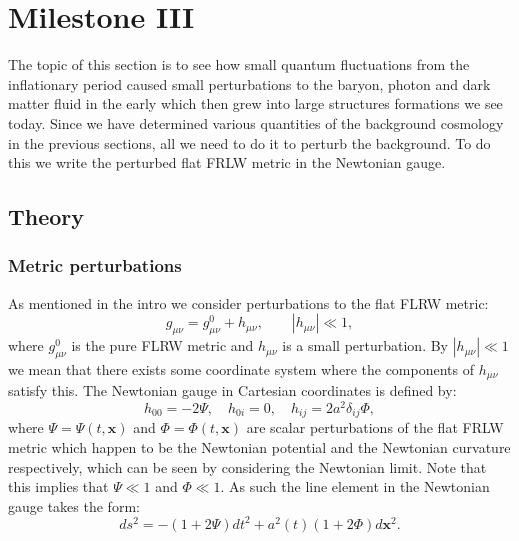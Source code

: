 \documentclass[%
reprint,
 amsmath,amssymb,
 aps,
]{revtex4-2}
\begin{document}
\section{Milestone III}
The topic of this section is to see how small quantum fluctuations from the inflationary period caused small perturbations to the baryon, photon and dark matter fluid in the early which then grew into large structures formations we see today. Since we have determined various quantities of the background cosmology in the previous sections, all we need to do it to perturb the background. To do this we write the perturbed flat FRLW metric in the Newtonian gauge. 

\subsection{Theory}
\subsubsection{Metric perturbations}
As mentioned in the intro we consider perturbations to the flat FLRW metric:
\[g_{\mu\nu}=g^{0}_{\mu\nu}+h_{\mu\nu},\quad\quad|h_{\mu\nu}|\ll1,\]
where $g^0_{\mu\nu}$ is the pure FLRW metric and $h_{\mu\nu}$ is a small perturbation. By $|h_{\mu\nu}|\ll1$ we mean that there exists some coordinate system where the components of $h_{\mu\nu}$ satisfy this. The Newtonian gauge in Cartesian coordinates is defined by:
\[h_{00}=-2\Psi,\quad h_{0i}=0,\quad h_{ij}=2a^2\delta_{ij}\Phi,\]
where $\Psi=\Psi(t,\textbf{x})$ and $\Phi=\Phi(t,\textbf{x})$ are scalar perturbations of the flat FRLW metric which happen to be the Newtonian potential and the Newtonian curvature respectively, which can be seen by considering the Newtonian limit. Note that this implies that $\Psi\ll1$ and $\Phi\ll 1$. As such the line element in the Newtonian gauge takes the form:
\[ds^2=-(1+2\Psi)dt^2+a^2(t)(1+2\Phi)d\textbf{x}^2.\]
\end{document}

